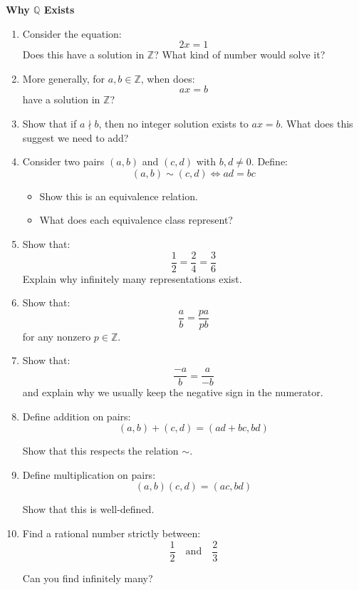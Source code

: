 \documentclass[11pt]{article}
\newcommand{\Z}{\mathbb{Z}}
\newcommand{\Q}{\mathbb{Q}}
\begin{document}
\begin{problembox}

\textbf{Why $\Q$ Exists}

\begin{enumerate}

\item Consider the equation:
\[
2x = 1
\]
Does this have a solution in $\Z$?  
What kind of number would solve it?

\item More generally, for $a,b \in \Z$, when does:
\[
ax = b
\]
have a solution in $\Z$?

\item Show that if $a \nmid b$, then no integer solution exists to $ax=b$.  
What does this suggest we need to add?

\item Consider two pairs $(a,b)$ and $(c,d)$ with $b,d \neq 0$.  
Define:
\[
(a,b) \sim (c,d) \iff ad = bc
\]

\begin{itemize}
\item Show this is an equivalence relation.
\item What does each equivalence class represent?
\end{itemize}

\item Show that:
\[
\frac{1}{2} = \frac{2}{4} = \frac{3}{6}
\]
Explain why infinitely many representations exist.

\item Show that:
\[
\frac{a}{b} = \frac{pa}{pb}
\]
for any nonzero $p \in \Z$.

\item Show that:
\[
\frac{-a}{b} = \frac{a}{-b}
\]
and explain why we usually keep the negative sign in the numerator.

\item Define addition on pairs:
\[
(a,b) + (c,d) = (ad+bc, bd)
\]

Show that this respects the relation $\sim$.

\item Define multiplication on pairs:
\[
(a,b)(c,d) = (ac, bd)
\]

Show that this is well-defined.

\item Find a rational number strictly between:
\[
\frac{1}{2} \quad \text{and} \quad \frac{2}{3}
\]

Can you find infinitely many?


\end{enumerate}
\end{problembox}
\end{document}
